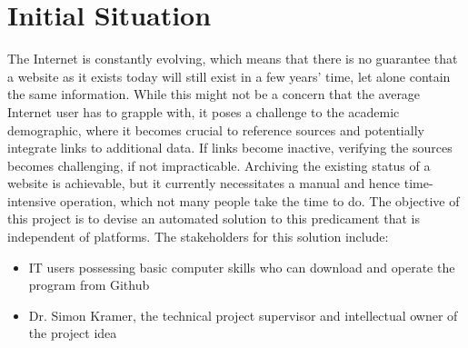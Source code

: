 \section{Initial Situation}
The Internet is constantly evolving, which means that there is no guarantee that a website as it exists today will still exist in a few years' time, let alone contain the same information. While this might not be a concern that the average Internet user has to grapple with, it poses a challenge to the academic demographic, where it becomes crucial to reference sources and potentially integrate links to additional data. If links become inactive, verifying the sources becomes challenging, if not impracticable.
Archiving the existing status of a website is achievable, but it currently necessitates a manual and hence time-intensive operation, which not many people take the time to do. The objective of this project is to devise an automated solution to this predicament that is independent of platforms.
The stakeholders for this solution include:
\begin{itemize}
    \item IT users possessing basic computer skills who can download and operate the program from Github
    \item Dr. Simon Kramer, the technical project supervisor and intellectual owner of the project idea
\end{itemize}
\clearpage

